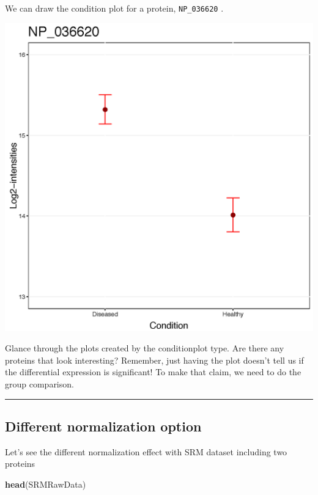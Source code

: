 \documentclass[]{book}
\newenvironment{Shaded}{\begin{snugshade}}{\end{snugshade}}
\newcommand{\KeywordTok}[1]{\textcolor[rgb]{0.13,0.29,0.53}{\textbf{#1}}}
\newcommand{\NormalTok}[1]{#1}
\begin{document}
We can draw the condition plot for a protein, \texttt{NP\_036620} .

\includegraphics{img/MSstats_ConditionPlot_36620.png}

Glance through the plots created by the conditionplot type. Are there any proteins that look interesting? Remember, just having the plot doesn't tell us if the differential expression is significant! To make that claim, we need to do the group comparison.

\begin{center}\rule{0.5\linewidth}{\linethickness}\end{center}

\hypertarget{different-normalization-option}{%
\subsection{Different normalization option}\label{different-normalization-option}}

Let's see the different normalization effect with SRM dataset including two proteins

\begin{Shaded}
\begin{Highlighting}[]
\KeywordTok{head}\NormalTok{(SRMRawData)}
\end{Highlighting}
\end{Shaded}
\end{document}
